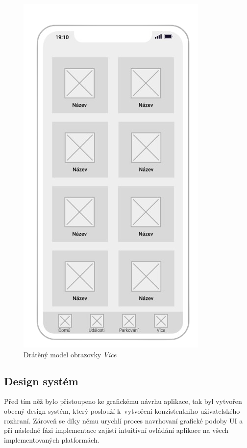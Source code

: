 \begin{minipage}[t]{0.45\textwidth}
\begin{figure}[H]
    \includegraphics[width=.7\textwidth]{more_wireframe.png}
    \caption{Drátěný model obrazovky \textit{Více}}
    \label{fig:wireframe4}
  \end{figure}
\end{minipage}

\subsection{Design systém} \label{designSystemSection}
Před tím něž bylo přistoupeno ke grafickému návrhu aplikace, tak byl vytvořen obecný design systém, který poslouží k~vytvoření 
konzistentního uživatelského rozhraní. Zároveň se díky němu urychlí proces navrhovaní grafické podoby UI a při následné fázi implementace 
zajistí intuitivní ovládání aplikace na všech implementovaných platformách. 


